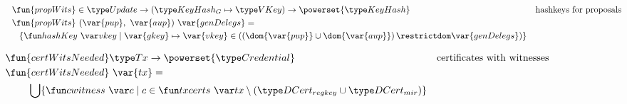 \begin{figure}[htb]
  \begin{align*}
    & \fun{propWits} \in \Update \to (\KeyHashGen\mapsto\VKey) \to \powerset{\KeyHash}
    & \text{hashkeys for proposals} \\
    & \fun{propWits}~(\var{pup},~\var{aup})~\var{genDelegs} = \\
    & ~~\left\{
      \hashKey{vkey}
      \mid
      \var{gkey}\mapsto\var{vkey}\in
      \left(\left(\dom{\var{pup}}\cup\dom{\var{aup}}\right)\restrictdom\var{genDelegs}\right)
      \right\}
  \end{align*}

  \begin{align*}
    & \hspace{-0.8cm}\fun{certWitsNeeded} \Tx \to \powerset{\Credential}
    & \text{certificates with witnesses} \\
    &  \hspace{-0.8cm}\fun{certWitsNeeded}~\var{tx} = \\
    & \bigcup\{\cwitness{c} \mid c \in \txcerts{tx} \setminus (\DCertRegKey\cup\DCertMir)\}
  \end{align*}


\end{figure}
